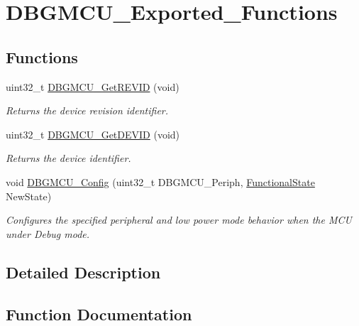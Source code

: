 \hypertarget{group___d_b_g_m_c_u___exported___functions}{}\section{D\+B\+G\+M\+C\+U\+\_\+\+Exported\+\_\+\+Functions}
\label{group___d_b_g_m_c_u___exported___functions}
\subsection*{Functions}
\begin{DoxyCompactItemize}
\item 
uint32\+\_\+t \mbox{\hyperlink{group___d_b_g_m_c_u___exported___functions_ga47419e9ca75ab7be4c70feb82faa0511}{D\+B\+G\+M\+C\+U\+\_\+\+Get\+R\+E\+V\+ID}} (void)
\begin{DoxyCompactList}\small\item\em Returns the device revision identifier. \end{DoxyCompactList}\item 
uint32\+\_\+t \mbox{\hyperlink{group___d_b_g_m_c_u___exported___functions_gac34193c34dbce759bf424957a31b3266}{D\+B\+G\+M\+C\+U\+\_\+\+Get\+D\+E\+V\+ID}} (void)
\begin{DoxyCompactList}\small\item\em Returns the device identifier. \end{DoxyCompactList}\item 
void \mbox{\hyperlink{group___d_b_g_m_c_u___exported___functions_gadf2f267f855ac1e4c03905c5dcfbd28b}{D\+B\+G\+M\+C\+U\+\_\+\+Config}} (uint32\+\_\+t D\+B\+G\+M\+C\+U\+\_\+\+Periph, \mbox{\hyperlink{group___exported__types_gac9a7e9a35d2513ec15c3b537aaa4fba1}{Functional\+State}} New\+State)
\begin{DoxyCompactList}\small\item\em Configures the specified peripheral and low power mode behavior when the M\+CU under Debug mode. \end{DoxyCompactList}\end{DoxyCompactItemize}


\subsection{Detailed Description}


\subsection{Function Documentation}
\mbox{\label{group___d_b_g_m_c_u___exported___functions_gadf2f267f855ac1e4c03905c5dcfbd28b}} 
